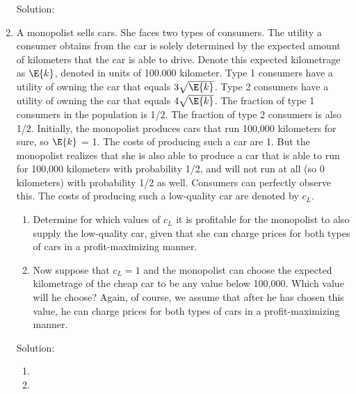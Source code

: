\begin{enumerate}
	      Solution:
	\item A monopolist sells cars. She faces two types of consumers. The utility a consumer
	      obtains from the car is solely determined by the expected amount of kilometers
	      that the car is able to drive. Denote this expected kilometrage as $\E{k}$, denoted
	      in units of 100.000 kilometer. Type 1 consumers have a utility of owning the car
	      that equals $3\sqrt{\E{k}}$. Type 2 consumers have a utility of owning the car that equals
	      $4\sqrt{\E{k}}$. The fraction of type 1 consumers in the population is 1/2. The fraction
	      of type 2 consumers is also 1/2. Initially, the monopolist produces cars that run
	      100,000 kilometers for sure, so $\E{k}$ = 1. The costs of producing such a car are 1.
	      But the monopolist realizes that she is also able to produce a car that is able to run
	      for 100,000 kilometers with probability 1/2, and will not run at all (so 0 kilometers)
	      with probability 1/2 as well. Consumers can perfectly observe this. The costs of
	      producing such a low-quality car are denoted by $c_L$.
	      \begin{enumerate}
		      \item Determine for which values of $c_L$ it is profitable for the monopolist to also
		            supply the low-quality car, given that she can charge prices for both types of
		            cars in a profit-maximizing manner.
		      \item Now suppose that $c_L = 1$ and the monopolist can choose the expected kilometrage of the cheap car to be any value below 100,000.
		            Which value will he
		            choose? Again, of course, we assume that after he has chosen this value, he
		            can charge prices for both types of cars in a profit-maximizing manner.
	      \end{enumerate}

	      Solution:
	      \begin{enumerate}
		      \item
		      \item
	      \end{enumerate}
\end{enumerate}
